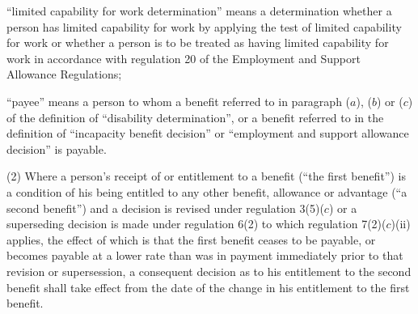 \documentclass[12pt,a4paper]{article}
\begin{document}
\begin{enumerate}
“limited capability for work determination” means a determination whether a person has limited capability for work by applying the test of limited capability for work or whether a person is to be treated as having limited capability for work in accordance with regulation 20 of the Employment and Support Allowance Regulations;

\begin{sloppypar}
“payee” means a person to whom a benefit referred to in paragraph ($a$), ($b$) or ($c$) of the definition of “disability determination”, or a benefit referred to in the definition of “incapacity benefit decision” 
or “employment and support allowance decision”  %
is payable.
\end{sloppypar}
\end{enumerate}

(2) Where a person’s receipt of or entitlement to a benefit (“the first benefit”) is a condition of his being entitled to any other benefit, allowance or advantage (“a second benefit”) and a decision is revised under regulation 3(5)($c$) or a superseding decision is made under regulation 6(2) to which regulation 7(2)($c$)(ii) applies, the effect of which is that the first benefit ceases to be payable, or becomes payable at a lower rate than was in payment immediately prior to that revision or supersession, a consequent decision as to his entitlement to the second benefit shall take effect from the date of the change in his entitlement to the first benefit.

\end{document}
